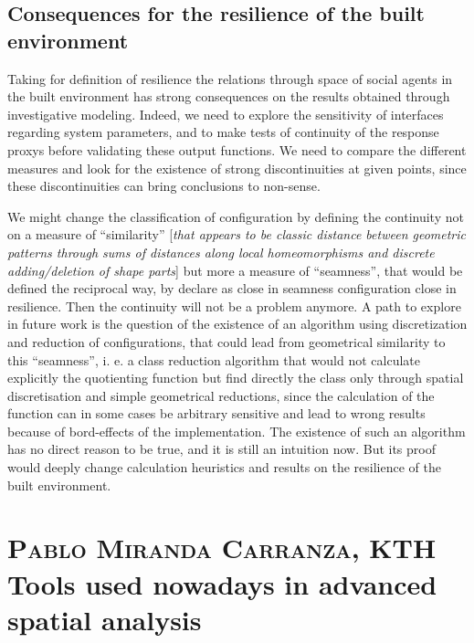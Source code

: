 \documentclass[english]{article}
\newcommand{\noun}[1]{\textsc{#1}}
\begin{document}
\bigskip{}



\subsection*{Consequences for the resilience of the built environment}

Taking for definition of resilience the relations through space of
social agents in the built environment has strong consequences on
the results obtained through investigative modeling. Indeed, we need
to explore the sensitivity of interfaces regarding system parameters,
and to make tests of continuity of the response proxys before validating
these output functions. We need to compare the different measures
and look for the existence of strong discontinuities at given points,
since these discontinuities can bring conclusions to non-sense.

\bigskip{}
\bigskip{}


We might change the classification of configuration by defining the
continuity not on a measure of ``similarity'' {[}\textit{that appears
to be classic distance between geometric patterns through sums of
distances along local homeomorphisms and discrete adding/deletion
of shape parts}{]} but more a measure of ``seamness'', that would
be defined the reciprocal way, by declare as close in seamness configuration
close in resilience. Then the continuity will not be a problem anymore.
A path to explore in future work is the question of the existence
of an algorithm using discretization and reduction of configurations,
that could lead from geometrical similarity to this ``seamness'',
i. e. a class reduction algorithm that would not calculate explicitly
the quotienting function but find directly the class only through
spatial discretisation and simple geometrical reductions, since the
calculation of the function can in some cases be arbitrary sensitive
and lead to wrong results because of bord-effects of the implementation.
The existence of such an algorithm has no direct reason to be true,
and it is still an intuition now. But its proof would deeply change
calculation heuristics and results on the resilience of the built
environment.

\newpage{}


\section*{\noun{Pablo Miranda Carranza}, KTH\protect \\
Tools used nowadays in advanced spatial analysis}
\end{document}
